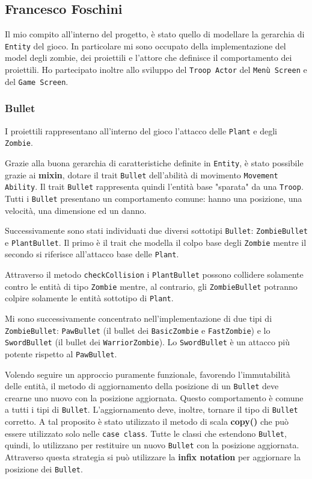 \subsection{Francesco Foschini}
Il mio compito all'interno del progetto, è stato quello di modellare la gerarchia di \texttt{Entity} del gioco.
In particolare mi sono occupato della implementazione del model degli zombie, dei proiettili e l'attore che definisce il comportamento dei proiettili.
Ho partecipato inoltre allo sviluppo del \texttt{Troop Actor} del \texttt{Menù Screen} e del \texttt{Game Screen}.

\subsubsection{Bullet}
I proiettili rappresentano all'interno del gioco l'attacco delle \texttt{Plant} e degli \texttt{Zombie}.

Grazie alla buona gerarchia di caratteristiche definite in \texttt{Entity}, è stato possibile grazie  ai \textbf{mixin},
dotare il trait \texttt{Bullet} dell'abilità di movimento \texttt{Movement Ability}.
Il trait \texttt{Bullet} rappresenta quindi l'entità base "sparata" da una \texttt{Troop}.
Tutti i \texttt{Bullet} presentano un comportamento comune: hanno una posizione, una velocità, una dimensione ed un danno.


Successivamente sono stati individuati due diversi sottotipi \texttt{Bullet}: \texttt{ZombieBullet} e \texttt{PlantBullet}.
Il primo è il trait che modella il colpo base degli \texttt{Zombie} mentre il secondo si riferisce all'attacco base delle \texttt{Plant}.

Attraverso il metodo \texttt{checkCollision} i \texttt{PlantBullet} possono collidere solamente contro le entità di tipo \texttt{Zombie} mentre,
al contrario, gli \texttt{ZombieBullet} potranno colpire solamente le entità sottotipo di \texttt{Plant}.

Mi sono successivamente concentrato nell'implementazione di due tipi di \texttt{ZombieBullet}: \texttt{PawBullet} (il bullet dei
\texttt{BasicZombie} e \texttt{FastZombie}) e lo \texttt{SwordBullet} (il bullet dei \texttt{WarriorZombie}).
Lo \texttt{SwordBullet} è un attacco più potente rispetto al \texttt{PawBullet}.

Volendo seguire un approccio puramente funzionale, favorendo l'immutabilità delle entità, il metodo di
aggiornamento della posizione di un \texttt{Bullet} deve crearne uno nuovo con la posizione aggiornata.
Questo comportamento è comune a tutti i tipi di \texttt{Bullet}. L'aggiornamento deve, inoltre,
tornare il tipo di \texttt{Bullet} corretto. A tal proposito è stato utilizzato il metodo di scala  \textbf{copy()} che può essere utilizzato solo nelle \texttt{case class}. Tutte le classi che estendono
\texttt{Bullet}, quindi, lo utilizzano per restituire un nuovo \texttt{Bullet} con la posizione aggiornata.
Attraverso questa strategia si può utilizzare la \textbf{infix notation} per aggiornare la posizione dei \texttt{Bullet}.

